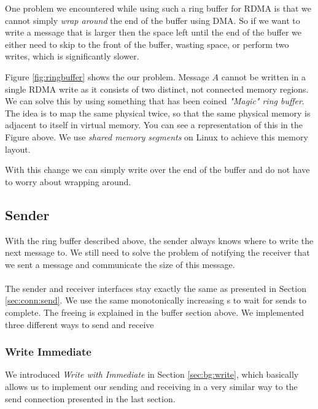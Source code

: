 One problem we encountered while using such a ring buffer for RDMA is that we cannot simply 
\emph{wrap around} the end of the buffer using DMA. So if we want to write a message that is larger then the space left until
the end of the buffer we either need to skip to the front of the buffer, wasting space, or perform two writes, which is 
significantly slower.

Figure \ref{fig:ringbuffer} shows the our problem. Message $A$ cannot be written in a single RDMA write as it consists of 
two distinct, not connected memory regions. We can solve this by using something that has been coined 
\emph{"Magic" ring buffer}. The idea is to map the same physical twice, so that the same physical memory is adjacent to itself
in virtual memory. You can see a representation of this in the Figure above. We use \emph{shared memory segments} on 
Linux to achieve this memory layout.

With this change we can simply write over the end of the buffer and do not have to worry about wrapping around.




\subsection{Sender} \label{sec:conn:write:sender}

With the ring buffer described above, the sender always knows where to write the next message to. We still need to solve
the problem of notifying the receiver that we sent a message and communicate the size of this message.

\paragraph{}The sender and receiver interfaces stay exactly the same as presented in Section \ref{sec:conn:send}. We use the same 
monotonically increasing s to wait for sends to complete. The freeing is explained in the buffer section
above. We implemented three different ways to send and receive


\subsubsection{Write Immediate}

We introduced \emph{Write with Immediate} in Section \ref{sec:bg:write}, which basically allows us to implement our sending 
and receiving in a very similar way to the send connection presented in the last section.

